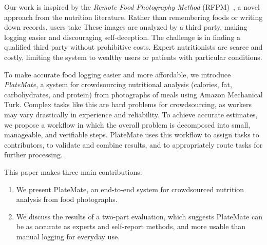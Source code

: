 Our work is inspired by the \emph{Remote Food Photography Method} (RFPM)~\cite{martin2009novel}, a novel approach from the nutrition literature. Rather
than remembering foods or writing down records, users take
These images are analyzed by a third party, making logging easier and
discouraging self-deception. The challenge is in finding a qualified
third party without prohibitive costs. Expert nutritionists are 
scarce and costly, limiting the system to wealthy users or patients with
particular conditions.

To make accurate food logging easier and more affordable, we introduce
\emph{PlateMate}, a system for crowdsourcing nutritional analysis
(calories, fat, carbohydrates, and protein) from photographs of meals
using Amazon Mechanical Turk.
Complex tasks like this are hard problems for
crowdsourcing, as workers may vary drastically in experience and
reliability. To achieve accurate estimates, we propose a workflow in 
which the overall problem is decomposed into
small, manageable, and verifiable steps.
PlateMate uses this workflow to assign tasks to contributors, to validate and combine results, and to appropriately route tasks for further processing.

This paper makes three main contributions:
\begin{enumerate}
\item We present PlateMate, an end-to-end system for crowdsourced nutrition analysis from food photographs.
\item We discuss the results of a two-part evaluation, which suggests
  PlateMate can be as accurate as experts and self-report methods, and
  more usable than manual logging for everyday use.
\end{enumerate}

